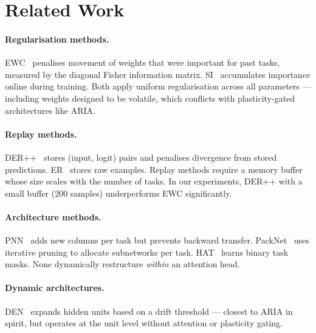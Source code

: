\documentclass[10pt,twocolumn]{article}
\begin{document}
\section{Related Work}
\label{sec:related}

\paragraph{Regularisation methods.}
EWC~\citep{kirkpatrick2017overcoming} penalises movement of weights that were important
for past tasks, measured by the diagonal Fisher information matrix.
SI~\citep{zenke2017continual} accumulates importance online during training.
Both apply uniform regularisation across all parameters --- including weights designed
to be volatile, which conflicts with plasticity-gated architectures like ARIA.

\paragraph{Replay methods.}
DER++~\citep{buzzega2020dark} stores (input, logit) pairs and penalises divergence
from stored predictions. ER~\citep{rolnick2019experience} stores raw examples.
Replay methods require a memory buffer whose size scales with the number of tasks.
In our experiments, DER++ with a small buffer (200 samples) underperforms EWC significantly.

\paragraph{Architecture methods.}
PNN~\citep{rusu2016progressive} adds new columns per task but prevents backward transfer.
PackNet~\citep{mallya2018packnet} uses iterative pruning to allocate subnetworks per task.
HAT~\citep{serra2018overcoming} learns binary task masks. None dynamically restructure
\emph{within} an attention head.

\paragraph{Dynamic architectures.}
DEN~\citep{yoon2018lifelong} expands hidden units based on a drift threshold ---
closest to ARIA in spirit, but operates at the unit level without attention or plasticity gating.
\end{document}
